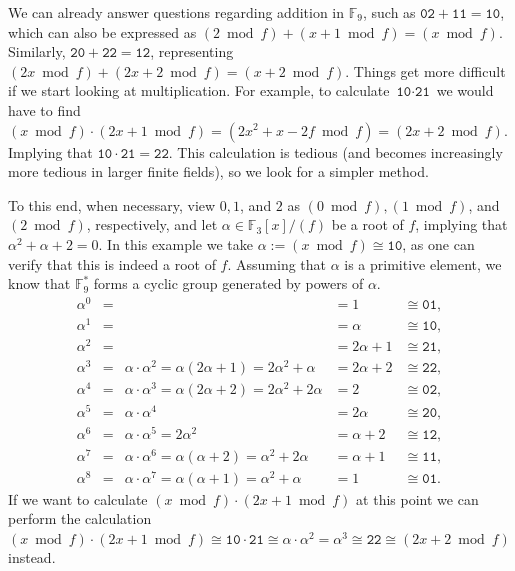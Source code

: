 \documentclass[openany, a4paper, 10pt]{book}
\theoremstyle{plain}
\theoremstyle{plain}
\theoremstyle{plain}
\theoremstyle{definition}
\theoremstyle{plain}
\theoremstyle{definition}
\theoremstyle{remark}
\begin{document}
\begin{examplebox}
    We can already answer questions regarding addition in $\mathbb F_9$, such as $\texttt{02} + \texttt{11} = \texttt{10}$, which can also be expressed as $(2 \bmod f) + (x+1 \bmod f) = (x \bmod f)$.
    Similarly, $\texttt{20} + \texttt{22} = \texttt{12}$, representing $(2x \bmod f) + (2x+2 \bmod f) = (x+2 \bmod f)$.
    Things get more difficult if we start looking at multiplication.
    For example, to calculate $\texttt{10} \cdot \texttt{21}$
    we would have to find $(x \bmod f) \cdot (2x+1 \bmod f) = (2x^2+x - 2f \bmod f) = (2x+2 \bmod f)$.
    Implying that $\texttt{10} \cdot \texttt{21} = \texttt{22}$.
    This calculation is tedious (and becomes increasingly more tedious in larger finite fields), so we look for a simpler method.

    To this end, when necessary, view $0, 1$, and $2$ as $(0 \bmod f), (1\bmod f)$, and $(2 \bmod f)$, respectively, and let $\alpha \in \mathbb F_3[x]/(f)$ be a root of $f$, implying that $\alpha^2 + \alpha + 2 = 0$.
    In this example we take $\alpha := (x \bmod f) \cong \texttt{10}$, as one can verify that this is indeed a root of $f$.
    Assuming that $\alpha$ is a primitive element, we know that $\mathbb F_9^*$ forms a cyclic group generated by powers of $\alpha$.
    {\allowdisplaybreaks\begin{align*}
        \alpha^0&=&&=1&\cong\texttt{01},\\
        \alpha^1&=&&=\alpha&\cong\texttt{10},\\
        \alpha^2&=&&=2\alpha+1&\cong\texttt{21},\\
        \alpha^3&=&\alpha\cdot\alpha^2=\alpha(2\alpha+1) = 2\alpha^2 + \alpha &= 2\alpha+2&\cong\texttt{22},\\
        \alpha^4&=&\alpha\cdot\alpha^3=\alpha(2\alpha+2)=2\alpha^2+2\alpha&=2&\cong\texttt{02},\\
        \alpha^5&=&\alpha\cdot\alpha^4&=2\alpha&\cong\texttt{20},\\
        \alpha^6&=&\alpha\cdot\alpha^5=2\alpha^2&=\alpha+2&\cong\texttt{12},\\
        \alpha^7&=&\alpha\cdot\alpha^6=\alpha(\alpha+2)=\alpha^2+2\alpha&=\alpha+1&\cong\texttt{11},\\
        \alpha^8&=&\alpha\cdot\alpha^7=\alpha(\alpha+1)=\alpha^2+\alpha&=1&\cong\texttt{01}.
    \end{align*}
    }If we want to calculate $(x \bmod f) \cdot (2x+1 \bmod f)$ at this point we can perform the calculation $(x \bmod f) \cdot (2x+1 \bmod f)\cong \texttt{10} \cdot \texttt{21} \cong \alpha \cdot \alpha^2 = \alpha^3 \cong \texttt{22} \cong (2x+2 \bmod f)$ instead.


\end{examplebox}
\end{document}

